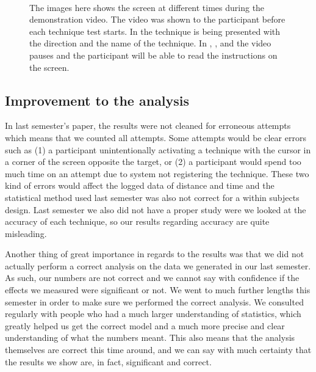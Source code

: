 \begin{figure}[H]
\\
\caption{The images here shows the screen at different times during the demonstration video. The video was shown to the participant before each technique test starts. In \protect{} the technique is being presented with the direction and the name of the technique. In \protect{}, \protect{}, and \protect{} the video pauses and the participant will be able to read the instructions on the screen.}
\label{fig:demovideo}
\end{figure}

\subsection*{Improvement to the analysis}

In last semester's paper, the results were not cleaned for erroneous attempts which means that we counted all attempts. 
Some attempts would be clear errors such as (1) a participant unintentionally activating a technique with the cursor in a corner of the screen opposite the target, or (2) a participant would spend too much time on an attempt due to system not registering the technique.
These two kind of errors would affect the logged data of distance and time and the statistical method used last semester was also not correct for a within subjects design.
Last semester we also did not have a proper study were we looked at the accuracy of each technique, so our results regarding accuracy are quite misleading. 

Another thing of great importance in regards to the results was that we did not actually perform a correct analysis on the data we generated in our last semester.
As such, our numbers are not correct and we cannot say with confidence if the effects we measured were significant or not. 
We went to much further lengths this semester in order to make sure we performed the correct analysis. 
We consulted regularly with people who had a much larger understanding of statistics, which greatly helped us get the correct model and a much more precise and clear understanding of what the numbers meant. 
This also means that the analysis themselves are correct this time around, and we can say with much certainty that the results we show are, in fact, significant and correct.  
